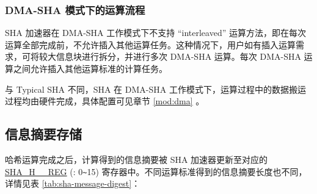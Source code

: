 \documentclass[main\_\_CN.tex]{subfiles}
\begin{document}




\subsubsection{DMA-SHA 模式下的运算流程}\label{sec:sha-dma-sha}

\chipname{} SHA 加速器在 DMA-SHA 工作模式下不支持 “interleaved” 运算方法，即在每次运算全部完成前，不允许插入其他运算任务。这种情况下，用户如有插入运算需求，可将较大信息块进行拆分，并进行多次 DMA-SHA 运算。每次 DMA-SHA 运算之间允许插入其他运算标准的计算任务。

与 Typical SHA 不同，SHA 在 DMA-SHA 工作模式下，运算过程中的数据搬运过程均由硬件完成，具体配置可见章节 \ref{mod:dma} \textit{}。





\subsection{信息摘要存储}

哈希运算完成之后，计算得到的信息摘要被 SHA 加速器更新至对应的 \hyperref[regdesc:SHAHNREG]{SHA\_H\_\_REG} (: 0\verb+~+15) 寄存器中。不同运算标准得到的信息摘要长度也不同，详情见表 \ref{tab:sha-message-digest}：
\end{document}
